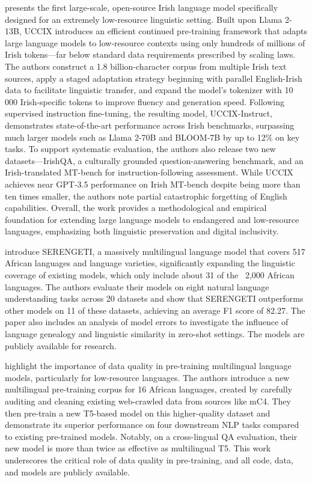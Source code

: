 \documentclass[acmsmall]{acmart}
\begin{document}
  \citep{tran2024uccixirishexcellencelargelanguage} presents the first large-scale, open-source Irish language model specifically designed for an extremely low-resource linguistic setting. Built upon Llama 2-13B, UCCIX introduces an efficient continued pre-training framework that adapts large language models to low-resource contexts using only hundreds of millions of Irish tokens—far below standard data requirements prescribed by scaling laws. The authors construct a 1.8 billion-character corpus from multiple Irish text sources, apply a staged adaptation strategy beginning with parallel English-Irish data to facilitate linguistic transfer, and expand the model’s tokenizer with 10 000 Irish-specific tokens to improve fluency and generation speed. Following supervised instruction fine-tuning, the resulting model, UCCIX-Instruct, demonstrates state-of-the-art performance across Irish benchmarks, surpassing much larger models such as Llama 2-70B and BLOOM-7B by up to 12\% on key tasks. To support systematic evaluation, the authors also release two new datasets—IrishQA, a culturally grounded question-answering benchmark, and an Irish-translated MT-bench for instruction-following assessment. While UCCIX achieves near GPT-3.5 performance on Irish MT-bench despite being more than ten times smaller, the authors note partial catastrophic forgetting of English capabilities. Overall, the work provides a methodological and empirical foundation for extending large language models to endangered and low-resource languages, emphasizing both linguistic preservation and digital inclusivity.

\citep{adebara2023serengetimassivelymultilinguallanguage} introduce SERENGETI, a massively multilingual language model that covers 517 African languages and language varieties, significantly expanding the linguistic coverage of existing models, which only include about 31 of the ~2,000 African languages. The authors evaluate their models on eight natural language understanding tasks across 20 datasets and show that SERENGETI outperforms other models on 11 of these datasets, achieving an average F1 score of 82.27. The paper also includes an analysis of model errors to investigate the influence of language genealogy and linguistic similarity in zero-shot settings. The models are publicly available for research.

\citep{oladipo-etal-2023-better} highlight the importance of data quality in pre-training multilingual language models, particularly for low-resource languages. The authors introduce a new multilingual pre-training corpus for 16 African languages, created by carefully auditing and cleaning existing web-crawled data from sources like mC4. They then pre-train a new T5-based model on this higher-quality dataset and demonstrate its superior performance on four downstream NLP tasks compared to existing pre-trained models. Notably, on a cross-lingual QA evaluation, their new model is more than twice as effective as multilingual T5. This work underscores the critical role of data quality in pre-training, and all code, data, and models are publicly available.
\end{document}
